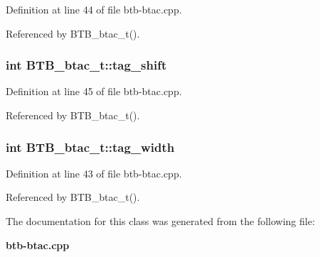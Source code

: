 Definition at line 44 of file btb-btac.cpp.

Referenced by BTB\_\-btac\_\-t().
\subsubsection[{tag\_\-shift}]{\setlength{\rightskip}{0pt plus 5cm}int {\bf BTB\_\-btac\_\-t::tag\_\-shift}\hspace{0.3cm}{\tt  [protected]}}\label{classBTB__btac__t_a1367f1b164090a6366def5f57deae63}




Definition at line 45 of file btb-btac.cpp.

Referenced by BTB\_\-btac\_\-t().
\subsubsection[{tag\_\-width}]{\setlength{\rightskip}{0pt plus 5cm}int {\bf BTB\_\-btac\_\-t::tag\_\-width}\hspace{0.3cm}{\tt  [protected]}}\label{classBTB__btac__t_946f59049044953739a118d4df76fbf2}




Definition at line 43 of file btb-btac.cpp.

Referenced by BTB\_\-btac\_\-t().

The documentation for this class was generated from the following file:\begin{CompactItemize}
\item 
{\bf btb-btac.cpp}\end{CompactItemize}
